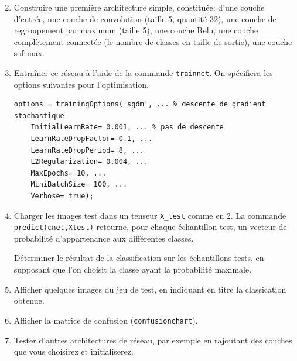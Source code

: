 \begin{enumerate}
	\setcounter{enumi}{1}
	\item Construire une première architecture simple, constituée: d'une couche d'entrée, une couche de convolution (taille 5, quantité 32), une couche de regroupement par maximum (taille 5), une couche Relu, une couche complètement connectée (le nombre de classes en taille de sortie), une couche softmax.
	
	\item Entraîner ce réseau à l'aide de la commande \texttt{trainnet}. On spécifiera les options suivantes pour l'optimisation.
	
\begin{lstlisting}
options = trainingOptions('sgdm', ... % descente de gradient stochastique
    InitialLearnRate= 0.001, ... % pas de descente
    LearnRateDropFactor= 0.1, ...
    LearnRateDropPeriod= 8, ...
    L2Regularization= 0.004, ...
    MaxEpochs= 10, ...
    MiniBatchSize= 100, ...
    Verbose= true);
\end{lstlisting} 

	\item Charger les images test dans un tenseur \texttt{X\_test} comme en 2. La commande \texttt{predict(cnet,Xtest)} retourne, pour chaque échantillon test, un vecteur de probabilité d'appartenance aux différentes classes.
	
	Déterminer le résultat de la classification sur les échantillons tests, en supposant que l'on choisit la classe ayant la probabilité maximale.
	
	
	\item Afficher quelques images du jeu de test, en indiquant en titre la classication obtenue.
	
	\item Afficher la matrice de confusion (\texttt{confusionchart}).

	\item Tester d'autres architectures de réseau, par exemple en rajoutant des couches que vous choisirez et initialiserez.
\end{enumerate}

